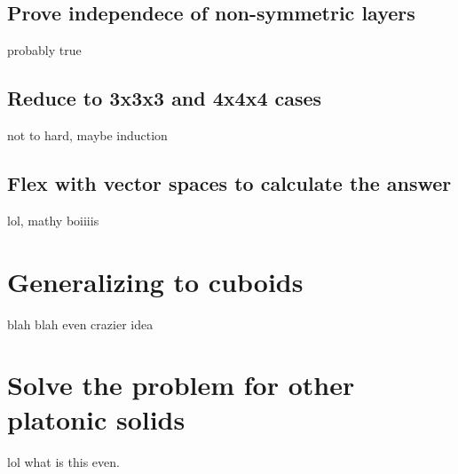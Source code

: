 \documentclass{article}
\begin{document}
        \subsection{Prove independece of non-symmetric layers}
            probably true

        \subsection{Reduce to 3x3x3 and 4x4x4 cases}
            not to hard, maybe induction

        \subsection{Flex with vector spaces to calculate the answer}
            lol, mathy boiiiis
    
    \section{Generalizing to cuboids}
        blah blah even crazier idea

    \section{Solve the problem for other platonic solids}
        lol what is this even.
\end{document}
